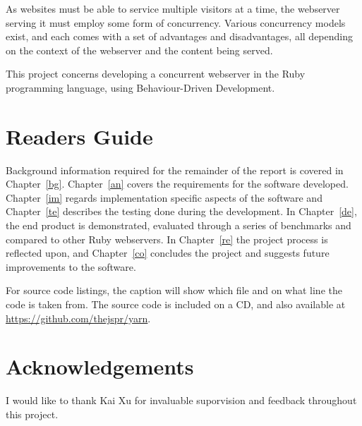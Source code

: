 %
As websites must be able to service multiple visitors at a time, the
webserver serving it must employ some form of concurrency. Various concurrency
models exist, and each comes with a set of advantages and disadvantages, all
depending on the context of the webserver and the content being served.

This project concerns developing a concurrent webserver in the Ruby
programming language, using Behaviour-Driven Development.

\section{Readers Guide}
Background information required for the remainder of the report is covered in
Chapter~\ref{bg}. Chapter~\ref{an} covers the requirements for the software
developed. Chapter~\ref{im} regards implementation specific aspects of the
software and Chapter~\ref{te} describes the testing done during the
development. In Chapter~\ref{de}, the end product is demonstrated,
evaluated through a series of benchmarks and compared to other Ruby
webservers. In Chapter~\ref{re} the project process is reflected upon, and
Chapter~\ref{co} concludes the project and suggests future improvements to the
software.

For source code listings, the caption will show which file and on what line
the code is taken from. The source code is included on a CD, and also
available at \url{https://github.com/thejspr/yarn}.


\section{Acknowledgements}
I would like to thank Kai Xu for invaluable suporvision and feedback
throughout this project.
